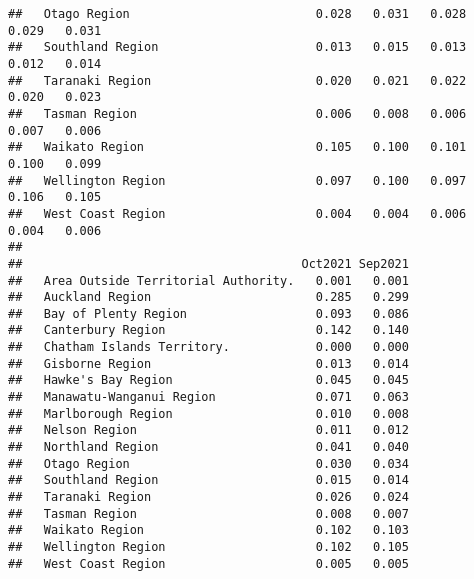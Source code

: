 \documentclass[
  10pt,
]{article}
\begin{document}
\begin{verbatim}
##   Otago Region                          0.028   0.031   0.028   0.029   0.031
##   Southland Region                      0.013   0.015   0.013   0.012   0.014
##   Taranaki Region                       0.020   0.021   0.022   0.020   0.023
##   Tasman Region                         0.006   0.008   0.006   0.007   0.006
##   Waikato Region                        0.105   0.100   0.101   0.100   0.099
##   Wellington Region                     0.097   0.100   0.097   0.106   0.105
##   West Coast Region                     0.004   0.004   0.006   0.004   0.006
##                                      
##                                       Oct2021 Sep2021
##   Area Outside Territorial Authority.   0.001   0.001
##   Auckland Region                       0.285   0.299
##   Bay of Plenty Region                  0.093   0.086
##   Canterbury Region                     0.142   0.140
##   Chatham Islands Territory.            0.000   0.000
##   Gisborne Region                       0.013   0.014
##   Hawke's Bay Region                    0.045   0.045
##   Manawatu-Wanganui Region              0.071   0.063
##   Marlborough Region                    0.010   0.008
##   Nelson Region                         0.011   0.012
##   Northland Region                      0.041   0.040
##   Otago Region                          0.030   0.034
##   Southland Region                      0.015   0.014
##   Taranaki Region                       0.026   0.024
##   Tasman Region                         0.008   0.007
##   Waikato Region                        0.102   0.103
##   Wellington Region                     0.102   0.105
##   West Coast Region                     0.005   0.005
\end{verbatim}
\end{document}
